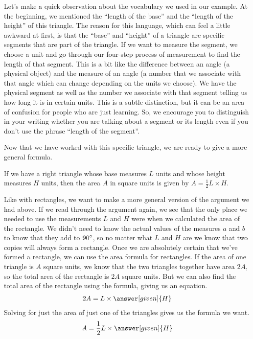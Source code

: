 \documentclass{ximera}
\begin{document}
Let's make a quick observation about the vocabulary we used in our example. At the beginning, we mentioned the ``length of the base''  and the ``length of the height'' of this triangle. The reason for this language, which can feel a little awkward at first, is that the ``base'' and ``height'' of a triangle are specific segments that are part of the triangle. If we want to measure the segment, we choose a unit and go through our four-step process of measurement to find the length of that segment. This is a bit like the difference between an angle (a physical object) and the measure of an angle (a number that we associate with that angle which can change depending on the units we choose). We have the physical segment as well as the number we associate with that segment telling us how long it is in certain units. This is a subtle distinction, but it can be an area of confusion for people who are just learning. So, we encourage you to distinguish in your writing whether you are talking about a segment or its length even if you don't use the phrase ``length of the segment''.

Now that we have worked with this specific triangle, we are ready to give a more general formula.
\begin{theorem}
If we have a right triangle whose base measures $L$ units and whose height measures $H$ units, then the area $A$ in square units is given by $A = \frac12 L \times H$.
\end{theorem}
\begin{explanation}
Like with rectangles, we want to make a more general version of the argument we had above. If we read through the argument again, we see that the only place we needed to use the measurements $L$ and $H$ were when we calculated the area of the rectangle. We didn't need to know the actual values of the measures $a$ and $b$ to know that they add to $90\degree$, so no matter what $L$ and $H$ are we know that two copies will always form a rectangle. Once we are absolutely certain that we've formed a rectangle, we can use the area formula for rectangles. If the area of one triangle is $A$ square units, we know that the two triangles together have area $2A$, so the total area of the rectangle is $2A$ square units. But we can also find the total area of the rectangle using the formula, giving us an equation.
\[
2A = L \times \answer[given]{H}
\]
Solving for just the area of just one of the triangles gives us the formula we want.
\[
A = \frac12 L \times \answer[given]{H}
\]
\end{explanation}
\end{document}
